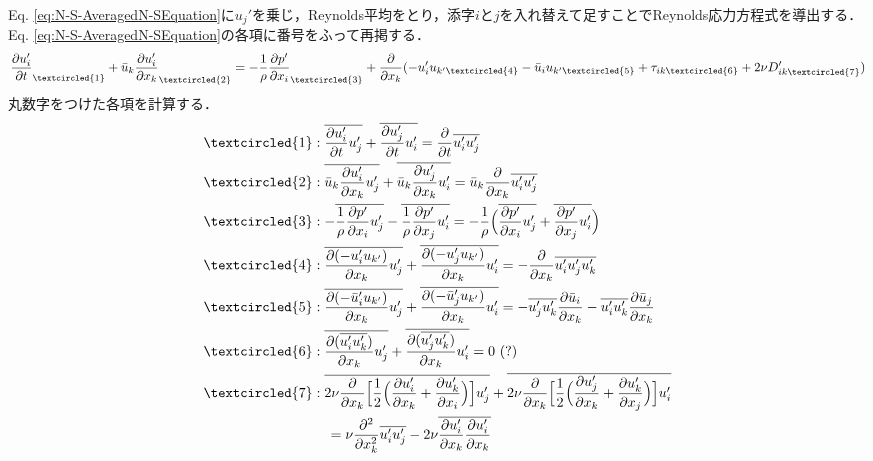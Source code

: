 \documentclass[12pt,a4paper]{jsarticle}
\begin{document}
Eq. \ref{eq:N-S-AveragedN-SEquation}に$u_j'$を乗じ，Reynolds平均をとり，添字$i$と$j$を入れ替えて足すことでReynolds応力方程式を導出する．
Eq. \ref{eq:N-S-AveragedN-SEquation}の各項に番号をふって再掲する．
\begin{equation*}
  \frac{\partial u_i'}{\partial t}_{\textcircled{\scriptsize 1}} +\bar{u}_k \frac{\partial u_i'}{\partial x_k}_{\textcircled{\scriptsize 2}} = -\frac{1}{\rho} \frac{\partial p'}{\partial x_i}_{\textcircled{\scriptsize 3}} +\frac{\partial}{\partial x_k} (-u_i' u_{k'\textcircled{\scriptsize 4}} -\bar{u}_i u_{k'\textcircled{\scriptsize 5}} +\tau_{ik \textcircled{\scriptsize 6}} +2 \nu D'_{ik \textcircled{\scriptsize 7}})
\end{equation*}
丸数字をつけた各項を計算する．
\begin{align*}
  \textcircled{\scriptsize 1} &: \overline{ \frac{\partial u_i'}{\partial t} u_j' } +\overline{ \frac{\partial u_j'}{\partial t} u_i' } = \frac{\partial}{\partial t} \overline{u_i' u_j'} \\
  \textcircled{\scriptsize 2} &: \overline{ \bar{u}_k \frac{\partial u_i'}{\partial x_k} u_j' } +\overline{ \bar{u}_k \frac{\partial u_j'}{\partial x_k} u_i' } = \bar{u}_k \frac{\partial}{\partial x_k} \overline{u_i' u_j'} \\
  \textcircled{\scriptsize 3} &: -\overline{ \frac{1}{\rho} \frac{\partial p'}{\partial x_i} u_j' } -\overline{ \frac{1}{\rho} \frac{\partial p'}{\partial x_j} u_i' } = - \frac{1}{\rho} \Big( \overline{ \frac{\partial p'}{\partial x_i} u_j' } +\overline{ \frac{\partial p'}{\partial x_j} u_i' } \Big) \\
  \textcircled{\scriptsize 4} &: \overline{ \frac{\partial (-u_i' u_{k'})}{\partial x_k} u_j' } +\overline{ \frac{\partial (-u_j' u_{k'})}{\partial x_k} u_i' } = -\frac{\partial}{\partial x_k} \overline{u_i' u_j' u_k'} \\
  \textcircled{\scriptsize 5} &: \overline{ \frac{\partial (-\bar{u}_i' u_{k'})}{\partial x_k} u_j' } +\overline{ \frac{\partial (-\bar{u}_j' u_{k'})}{\partial x_k} u_i' } = -\overline{u_j' u_k'} \frac{\partial \bar{u}_i}{\partial x_k} -\overline{u_i' u_k'} \frac{\partial \bar{u}_j}{\partial x_k} \\
  \textcircled{\scriptsize 6} &: \overline{ \frac{\partial (\overline{u_i' u_k'})}{\partial x_k} u_j' } +\overline{ \frac{\partial (\overline{u_j' u_k'})}{\partial x_k} u_i' } = 0 ~(?) \\
  \textcircled{\scriptsize 7} &: \overline{2 \nu \frac{\partial}{\partial x_k} \Big[ \frac{1}{2} \Big( \frac{\partial u_i'}{\partial x_k} +\frac{\partial u_k'}{\partial x_i} \Big) \Big] u_j' } +\overline{2 \nu \frac{\partial}{\partial x_k} \Big[ \frac{1}{2} \Big( \frac{\partial u_j'}{\partial x_k} +\frac{\partial u_k'}{\partial x_j} \Big) \Big] u_i' } \\
    &~~~ = \nu \frac{\partial^2}{\partial x_k^2} \overline{u_i' u_j'} -2\nu \overline{ \frac{\partial u_i'}{\partial x_k} \frac{\partial u_i'}{\partial x_k} }
\end{align*}
\end{document}
